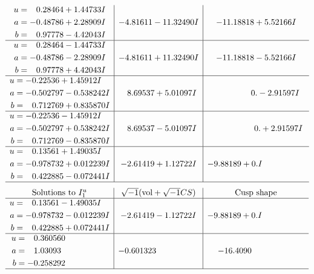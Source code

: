 \documentclass[1p]{elsarticle_modified}
\theoremstyle{definition}
\newcommand{\I}{\sqrt{-1}}
\begin{document}
$$\begin{array}{c|c|c}
\begin{aligned}
u &= \phantom{-}0.28464 + 1.44733 I \\
a &= -0.48786 + 2.28909 I \\
b &= \phantom{-}0.97778 - 4.42043 I\end{aligned}
 & -4.81611 - 11.32490 I & -11.18818 + 5.52166 I \\ \hline\begin{aligned}
u &= \phantom{-}0.28464 - 1.44733 I \\
a &= -0.48786 - 2.28909 I \\
b &= \phantom{-}0.97778 + 4.42043 I\end{aligned}
 & -4.81611 + 11.32490 I & -11.18818 - 5.52166 I \\ \hline\begin{aligned}
u &= -0.22536 + 1.45912 I \\
a &= -0.502797 - 0.538242 I \\
b &= \phantom{-}0.712769 + 0.835870 I\end{aligned}
 & \phantom{-}8.69537 + 5.01097 I & \phantom{-0.000000 } 0. - 2.91597 I \\ \hline\begin{aligned}
u &= -0.22536 - 1.45912 I \\
a &= -0.502797 + 0.538242 I \\
b &= \phantom{-}0.712769 - 0.835870 I\end{aligned}
 & \phantom{-}8.69537 - 5.01097 I & \phantom{-0.000000 -}0. + 2.91597 I \\ \hline\begin{aligned}
u &= \phantom{-}0.13561 + 1.49035 I \\
a &= -0.978732 + 0.012239 I \\
b &= \phantom{-}0.422885 - 0.072441 I\end{aligned}
 & -2.61419 + 1.12722 I & -9.88189 + 0. I\phantom{ +0.000000I}\\
 \hline 
 \end{array}$$\newpage$$\begin{array}{c|c|c}  
\text{Solutions to }I^u_{1}& \I (\text{vol} + \sqrt{-1}CS) & \text{Cusp shape}\\
 \hline 
\begin{aligned}
u &= \phantom{-}0.13561 - 1.49035 I \\
a &= -0.978732 - 0.012239 I \\
b &= \phantom{-}0.422885 + 0.072441 I\end{aligned}
 & -2.61419 - 1.12722 I & -9.88189 + 0. I\phantom{ +0.000000I} \\ \hline\begin{aligned}
u &= \phantom{-}0.360560\phantom{ +0.000000I} \\
a &= \phantom{-}1.03093\phantom{ +0.000000I} \\
b &= -0.258292\phantom{ +0.000000I}\end{aligned}
 & -0.601323\phantom{ +0.000000I} & -16.4090\phantom{ +0.000000I}\\
 \hline 
 \end{array}$$\newpage\newpage\renewcommand{\arraystretch}{1}
\end{document}
